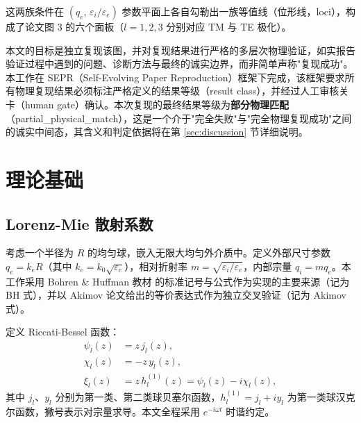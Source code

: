 \documentclass[12pt]{ctexart}
\begin{document}
这两族条件在 $(q_e,\, \varepsilon_i/\varepsilon_e)$ 参数平面上各自勾勒出一族等值线（位形线，loci），构成了论文图 3 的六个面板（$l=1,2,3$ 分别对应 TM 与 TE 极化）。

本文的目标是独立复现该图，并对复现结果进行严格的多层次物理验证，如实报告验证过程中遇到的问题、诊断方法与最终的诚实边界，而非简单声称"复现成功"。本工作在 SEPR（Self-Evolving Paper Reproduction）框架下完成，该框架要求所有物理复现结果必须标注严格定义的结果等级（result class），并经过人工审核关卡（human gate）确认。本次复现的最终结果等级为\textbf{部分物理匹配}（partial\_physical\_match），这是一个介于"完全失败"与"完全物理复现成功"之间的诚实中间态，其含义和判定依据将在第 \ref{sec:discussion} 节详细说明。

\section{理论基础}

\subsection{Lorenz-Mie 散射系数}

考虑一个半径为 $R$ 的均匀球，嵌入无限大均匀外介质中。定义外部尺寸参数 $q_e = k_e R$（其中 $k_e = k_0\sqrt{\varepsilon_e}$），相对折射率 $m=\sqrt{\varepsilon_i/\varepsilon_e}$，内部宗量 $q_i = m q_e$。本工作采用 Bohren \& Huffman 教材 \cite{bohren1983} 的标准记号与公式作为实现的主要来源（记为 BH 式），并以 Akimov 论文给出的等价表达式作为独立交叉验证（记为 Akimov 式）。

定义 Riccati-Bessel 函数：
\begin{align}
\psi_l(z) &= z\, j_l(z), \\
\chi_l(z) &= -z\, y_l(z), \\
\xi_l(z) &= z\, h_l^{(1)}(z) = \psi_l(z) - i\chi_l(z),
\end{align}
其中 $j_l$、$y_l$ 分别为第一类、第二类球贝塞尔函数，$h_l^{(1)}=j_l+iy_l$ 为第一类球汉克尔函数，撇号表示对宗量求导。本文全程采用 $e^{-i\omega t}$ 时谐约定。
\end{document}
